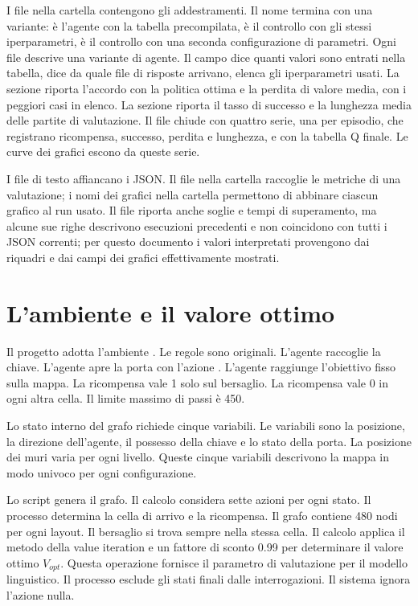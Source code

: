 \documentclass[12pt,a4paper]{article}
\begin{document}
I file nella cartella  contengono gli addestramenti. Il nome termina con una variante:  \`e l'agente con la tabella precompilata,  \`e il controllo con gli stessi iperparametri,  \`e il controllo con una seconda configurazione di parametri. Ogni file descrive una variante di agente. Il campo  dice quanti valori sono entrati nella tabella,  dice da quale file di risposte arrivano,  elenca gli iperparametri usati. La sezione  riporta l'accordo con la politica ottima e la perdita di valore media, con i peggiori casi in elenco. La sezione  riporta il tasso di successo e la lunghezza media delle partite di valutazione. Il file chiude con quattro serie, una per episodio, che registrano ricompensa, successo, perdita e lunghezza, e con la tabella Q finale. Le curve dei grafici escono da queste serie.

I file di testo affiancano i JSON. Il file  nella cartella  raccoglie le metriche di una valutazione; i nomi dei grafici nella cartella  permettono di abbinare ciascun grafico al run usato. Il file  riporta anche soglie e tempi di superamento, ma alcune sue righe descrivono esecuzioni precedenti e non coincidono con tutti i JSON correnti; per questo documento i valori interpretati provengono dai riquadri e dai campi dei grafici effettivamente mostrati.

\section{L'ambiente e il valore ottimo}\label{sec:ambiente}
Il progetto adotta l'ambiente  \cite{minigrid2023}. Le regole sono originali. L'agente raccoglie la chiave. L'agente apre la porta con l'azione . L'agente raggiunge l'obiettivo fisso sulla mappa. La ricompensa vale 1 solo sul bersaglio. La ricompensa vale 0 in ogni altra cella. Il limite massimo di passi \`e 450.

Lo stato interno del grafo richiede cinque variabili. Le variabili sono la posizione, la direzione dell'agente, il possesso della chiave e lo stato della porta. La posizione dei muri varia per ogni livello. Queste cinque variabili descrivono la mappa in modo univoco per ogni configurazione.

Lo script  genera il grafo. Il calcolo considera sette azioni per ogni stato. Il processo determina la cella di arrivo e la ricompensa. Il grafo contiene 480 nodi per ogni layout. Il bersaglio si trova sempre nella stessa cella. Il calcolo applica il metodo della value iteration e un fattore di sconto 0.99 per determinare il valore ottimo $V_{opt}$. Questa operazione fornisce il parametro di valutazione per il modello linguistico. Il processo esclude gli stati finali dalle interrogazioni. Il sistema ignora l'azione nulla.
\end{document}
